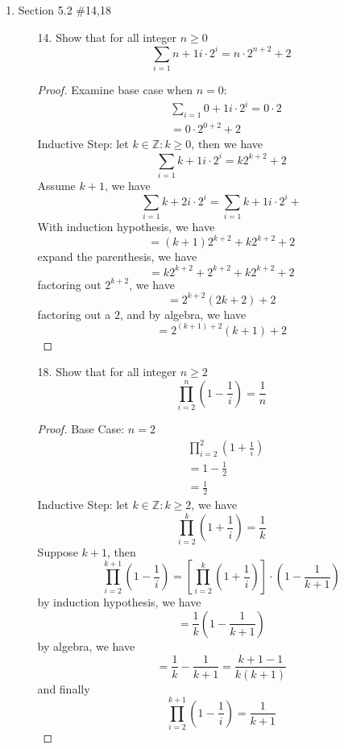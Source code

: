 \documentclass[12pt]{article}
\newcommand{\Z}{\mathbb{Z}}
\newcommand{\sqbkt}[1]{\left[ #1 \right]}
\newcommand{\paren}[1]{\left( #1 \right)}
\begin{document}
\begin{enumerate}
    \item Section 5.2 \#14,18
        \begin{enumerate}
            \item[14.] Show that for all integer $n \geq 0$
            \[
            \sum_{i=1}{n+1} i \cdot 2^i = n \cdot 2^{n+2} + 2
            \]
            \begin{proof}
            Examine base case when $n=0$:
            \begin{align*}
            &\sum_{i=1}{0+1} i \cdot 2^i = 0 \cdot 2\\
            &= 0 \cdot 2 ^{0+2} + 2
            \end{align*}
            Inductive Step: let $k \in \Z : k \geq 0$, then we have
            \[
            \sum_{i=1}{k+1} i \cdot 2^i = k2^{k+2}+2
            \]
            Assume $k+1$, we have
            \[
            \sum_{i=1}{k+2} i \cdot 2^i = 
            \sum_{i=1}{k+1} i \cdot 2^i + 
            \]
            With induction hypothesis, we have
            \[
            =(k+1)2^{k+2} +  k2^{k+2}+2
            \]
            expand the parenthesis, we have
            \[
            =k2^{k+2}+2^{k+2} + k2^{k+2}+2
            \]
            factoring out $2^{k+2}$, we have
            \[
            =2^{k+2}\paren{2k+2}+2
            \]
            factoring out a $2$, and by algebra, we have
            \[
            =2^{(k+1)+2}(k+1)+2
            \]
            
            \end{proof}

            \item[18.] Show that for all integer $n\geq 2$
                \[
                \prod_{i=2}^{n} \paren{1 - \frac{1}{i}} = \frac{1}{n}
                \]
            \begin{proof}
                Base Case: $n=2$
                \begin{align*}
                    &\prod_{i=2}^{2} \paren{1 + \frac{1}{i}}\\
                    &= 1 - \frac{1}{2}\\
                    &= \frac{1}{2}
                \end{align*}
                Inductive Step: let $ k \in \Z : k \geq 2$, we have
                \[
                \prod_{i=2}^{k} \paren{1 + \frac{1}{i}} = \frac{1}{k}
                \]
                Suppose $k+1$, then
                \[
                \prod_{i=2}^{k+1} \paren{1 - \frac{1}{i}} = \sqbkt{\prod_{i=2}^{k} \paren{1 + \frac{1}{i}}} \cdot \paren{1 - \frac{1}{k+1}}
                \]
                by induction hypothesis, we have
                \[
                = \frac{1}{k}\paren{1 - \frac{1}{k+1}}
                \]
                by algebra, we have
                \[
                =\frac{1}{k} - \frac{1}{k+1} =  \frac{k + 1 -1}{k(k+1)}
                \]
                and finally
                \[
                \prod_{i=2}^{k+1} \paren{1 - \frac{1}{i}} = \frac{1}{k+1}
                \]
                    

\end{proof}
\end{enumerate}
\end{enumerate}
\end{document}

